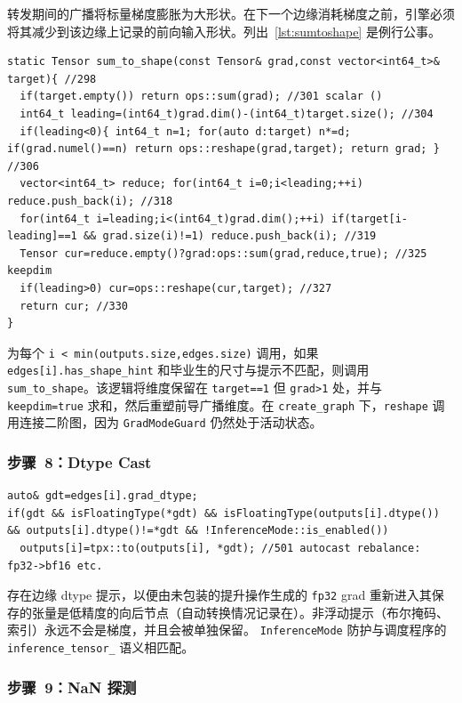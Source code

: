 转发期间的广播将标量梯度膨胀为大形状。在下一个边缘消耗梯度之前，引擎必须将其减少到该边缘上记录的前向输入形状。列出~\ref{lst:sumtoshape} 是例行公事。

\begin{lstlisting}[caption={broadcast recovery.}, label=lst:sumtoshape]
static Tensor sum_to_shape(const Tensor& grad,const vector<int64_t>& target){ //298
  if(target.empty()) return ops::sum(grad); //301 scalar ()
  int64_t leading=(int64_t)grad.dim()-(int64_t)target.size(); //304
  if(leading<0){ int64_t n=1; for(auto d:target) n*=d; if(grad.numel()==n) return ops::reshape(grad,target); return grad; } //306
  vector<int64_t> reduce; for(int64_t i=0;i<leading;++i) reduce.push_back(i); //318
  for(int64_t i=leading;i<(int64_t)grad.dim();++i) if(target[i-leading]==1 && grad.size(i)!=1) reduce.push_back(i); //319
  Tensor cur=reduce.empty()?grad:ops::sum(grad,reduce,true); //325 keepdim
  if(leading>0) cur=ops::reshape(cur,target); //327
  return cur; //330
}
\end{lstlisting}

为每个 \texttt{i < min(outputs.size,edges.size)} 调用，如果 \texttt{edges[i].has\_shape\_hint} 和毕业生的尺寸与提示不匹配，则调用 \texttt{sum\_to\_shape}。该逻辑将维度保留在 \texttt{target==1} 但 \texttt{grad>1} 处，并与 \texttt{keepdim=true} 求和，然后重塑前导广播维度。在 \texttt{create\_graph} 下，\texttt{reshape} 调用连接二阶图，因为 \texttt{GradModeGuard} 仍然处于活动状态。

\subsubsection{步骤~8：Dtype Cast}
\label{subsubsec:dtypecast}

\begin{lstlisting}[caption={dtype alignment.}, label=lst:dtypecast]
auto& gdt=edges[i].grad_dtype;
if(gdt && isFloatingType(*gdt) && isFloatingType(outputs[i].dtype()) && outputs[i].dtype()!=*gdt && !InferenceMode::is_enabled())
  outputs[i]=tpx::to(outputs[i], *gdt); //501 autocast rebalance: fp32->bf16 etc.
\end{lstlisting}

存在边缘 dtype 提示，以便由未包装的提升操作生成的 \texttt{fp32} grad 重新进入其保存的张量是低精度的向后节点（自动转换情况记录在）。非浮动提示（布尔掩码、索引）永远不会是梯度，并且会被单独保留。 \texttt{InferenceMode} 防护与调度程序的 \texttt{inference\_tensor\_} 语义相匹配。

\subsubsection{步骤~9：NaN 探测}
\label{subsubsec:nanprobe}

